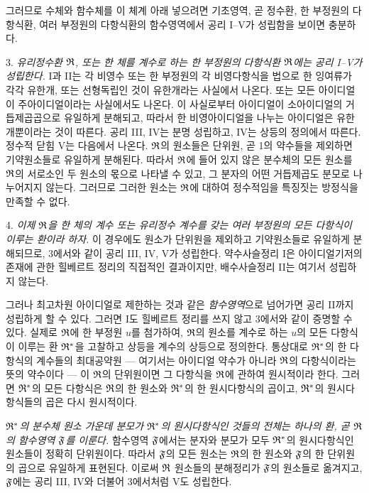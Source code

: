 그러므로 수체와 함수체를 이 체계 아래 넣으려면 기초영역, 곧 정수환, 한 부정원의 다항식환, 여러 부정원의 다항식환의 함수영역에서 공리 I--V가 성립함을 보이면 충분하다.

3. \emph{유리정수환 \(\mathfrak{R}\), 또는 한 체를 계수로 하는 한 부정원의 다항식환 \(\mathfrak{R}\)에는 공리 I--V가 성립한다.} I과 II는 각 비영수 또는 한 부정원의 각 비영다항식을 법으로 한 잉여류가 각각 유한개, 또는 선형독립인 것이 유한개라는 사실에서 나온다. 또는 모든 아이디얼이 주아이디얼이라는 사실에서도 나온다. 이 사실로부터 아이디얼이 소아이디얼의 거듭제곱곱으로 유일하게 분해되고, 따라서 한 비영아이디얼을 나누는 아이디얼은 유한개뿐이라는 것이 따른다. 공리 III, IV는 분명 성립하고, IV는 상등의 정의에서 따른다. 정수적 닫힘 V는 다음에서 나온다. \(\mathfrak{R}\)의 원소들은 단위원, 곧 1의 약수들을 제외하면 기약원소들로 유일하게 분해된다. 따라서 \(\mathfrak{R}\)에 들어 있지 않은 분수체의 모든 원소를 \(\mathfrak{R}\)의 서로소인 두 원소의 몫으로 나타낼 수 있고, 그 분자의 어떤 거듭제곱도 분모로 나누어지지 않는다. 그러므로 그러한 원소는 \(\mathfrak{R}\)에 대하여 정수적임을 특징짓는 방정식을 만족할 수 없다.

4. \emph{이제 \(\mathfrak{R}\)을 한 체의 계수 또는 유리정수 계수를 갖는 여러 부정원의 모든 다항식이 이루는 환이라 하자.} 이 경우에도 원소가 단위원을 제외하고 기약원소들로 유일하게 분해되므로, 3에서와 같이 공리 III, IV, V가 성립한다. 약수사슬정리 I은 아이디얼기저의 존재에 관한 힐베르트 정리의 직접적인 결과이지만, 배수사슬정리 II는 여기서 성립하지 않는다.

그러나 최고차원 아이디얼로 제한하는 것과 같은 \emph{함수영역}으로 넘어가면 공리 II까지 성립하게 할 수 있다. 그러면 I도 힐베르트 정리를 쓰지 않고 3에서와 같이 증명할 수 있다. 실제로 \(\mathfrak{R}\)에 한 부정원 \(u\)를 첨가하여, \(\mathfrak{R}\)의 원소를 계수로 하는 \(u\)의 모든 다항식이 이루는 환 \(\mathfrak{R}^*\)을 고찰하고 상등을 계수의 상등으로 정의한다. 통상대로 \(\mathfrak{R}^*\)의 한 다항식의 계수들의 최대공약원 --- 여기서는 아이디얼 약수가 아니라 \(\mathfrak{R}\)의 다항식이라는 뜻의 약수이다 --- 이 \(\mathfrak{R}\)의 단위원이면 그 다항식을 \(\mathfrak{R}\)에 관하여 원시적이라 한다. 그러면 \(\mathfrak{R}^*\)의 모든 다항식은 \(\mathfrak{R}\)의 한 원소와 \(\mathfrak{R}^*\)의 한 원시다항식의 곱이고, \(\mathfrak{R}^*\)의 원시다항식들의 곱은 다시 원시적이다.

\emph{\(\mathfrak{R}^*\)의 분수체 원소 가운데 분모가 \(\mathfrak{R}^*\)의 원시다항식인 것들의 전체는 하나의 환, 곧 \(\mathfrak{R}\)의 함수영역 \(\mathfrak{F}\)를 이룬다.} 함수영역 \(\mathfrak{F}\)에서는 분자와 분모가 모두 \(\mathfrak{R}^*\)의 원시다항식인 원소들이 정확히 단위원이다. 따라서 \(\mathfrak{F}\)의 모든 원소는 \(\mathfrak{R}\)의 한 원소와 \(\mathfrak{F}\)의 한 단위원의 곱으로 유일하게 표현된다. 이로써 \(\mathfrak{R}\) 원소들의 분해정리가 \(\mathfrak{F}\)의 원소들로 옮겨지고, \(\mathfrak{F}\)에는 공리 III, IV와 더불어 3에서처럼 V도 성립한다.

